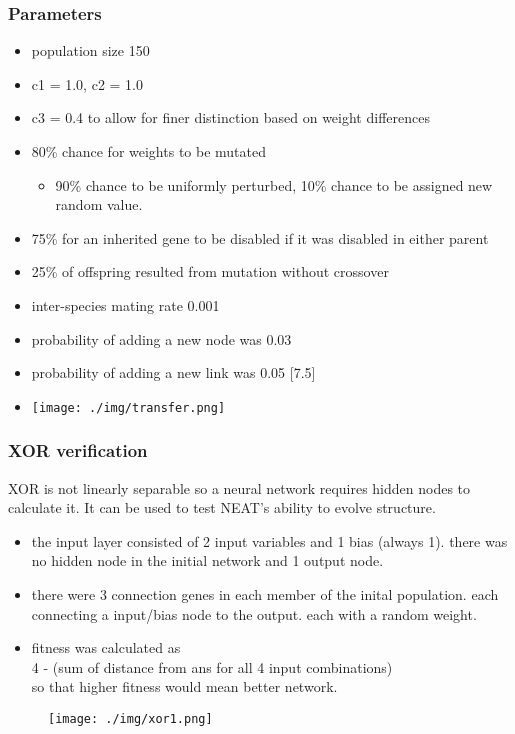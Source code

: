 \documentclass{beamer}
\begin{document}
\begin{frame}
\scriptsize
\frametitle{Parameters}
\begin{itemize}
\item population size 150
\item c1 = 1.0, c2 = 1.0
\item c3 = 0.4 to allow for finer distinction based on weight differences
\item 80\% chance for weights to be mutated
\begin{itemize}
\scriptsize
\item 90\% chance to be uniformly perturbed, 10\% chance to be assigned new random value.
\end{itemize}
\item 75\% for an inherited gene to be disabled if it was disabled in either parent
\item 25\% of offspring resulted from mutation without crossover
\item inter-species mating rate 0.001
\item probability of adding a new node was 0.03
\item probability of adding a new link was 0.05 [7.5]
\item \texttt{[image: ./img/transfer.png]}
\end{itemize}
\end{frame}

\begin{frame}
\scriptsize
\frametitle{XOR verification}
XOR is not linearly separable so a neural network requires hidden nodes to calculate it.
It can be used to test NEAT's ability to evolve structure.
\begin{itemize}
\item the input layer consisted of 2 input variables and 1 bias (always 1). there was no hidden node in the initial network and 1 output node.
\item there were 3 connection genes in each member of the inital population. each connecting a input/bias node to the output. each with a random weight.
\item fitness was calculated as
\\
4 - (sum of distance from ans for all 4 input combinations)
\\
so that higher fitness would mean better network.
\end{itemize}
\begin{figure}
\texttt{[image: ./img/xor1.png]}
\end{figure}
\end{frame}
\end{document}

